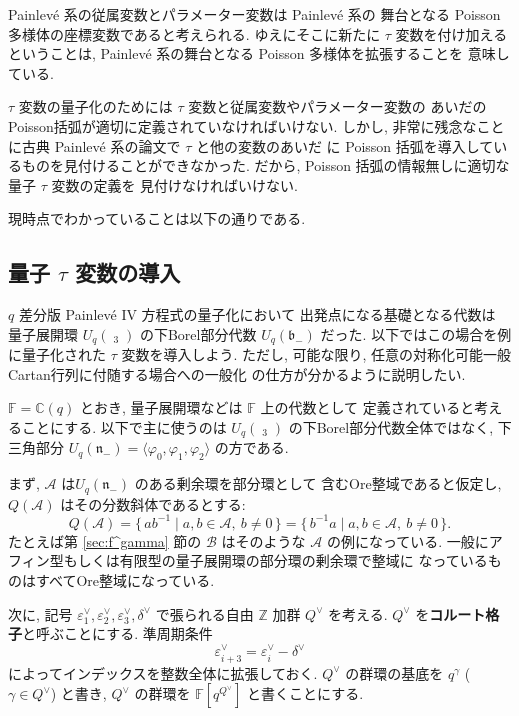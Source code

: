 \documentclass[12pt,twoside,dvipdfm]{msjproc}
\newcommand\Z{{\mathbb Z}} %
\newcommand\F{{\mathbb F}} %
\newcommand\C{{\mathbb C}} %
\theoremstyle{definition} %
\theoremstyle{definition} %
\theoremstyle{definition} %
\numberwithin{theorem}{section}
\numberwithin{equation}{section}
\numberwithin{figure}{section}
\numberwithin{table}{section}
\newcommand\secref[1]{第 \ref{#1} 節}
\newcommand\bor{\mathfrak{b}}
\newcommand\nil{\mathfrak{n}}
\newcommand\bra{\langle}
\newcommand\ket{\rangle}
\newcommand\A{\mathcal{A}}
\newcommand\B{\mathcal{B}}
\newcommand\glhat{\mathop{\widehat{\mathrm{gl}}}\nolimits}
\newcommand\ev{\varepsilon^\vee}
\newcommand\dv{\delta^\vee}
\newcommand\Qv{{Q^\vee}}
\begin{document}
Painlev\'e 系の従属変数とパラメーター変数は Painlev\'e 系の
舞台となる Poisson 多様体の座標変数であると考えられる.
ゆえにそこに新たに $\tau$ 変数を付け加えるということは,
Painlev\'e 系の舞台となる Poisson 多様体を拡張することを
意味している. 

$\tau$ 変数の量子化のためには $\tau$ 変数と従属変数やパラメーター変数の
あいだのPoisson括弧が適切に定義されていなければいけない.
しかし, 非常に残念なことに古典 Painlev\'e 系の論文で $\tau$ と他の変数のあいだ
に Poisson 括弧を導入しているものを見付けることができなかった.
だから, Poisson 括弧の情報無しに適切な量子 $\tau$ 変数の定義を
見付けなければいけない.

現時点でわかっていることは以下の通りである.



\subsection{量子 $\tau$ 変数の導入}

$q$ 差分版 Painlev\'e IV 方程式の量子化において
出発点になる基礎となる代数は
量子展開環 $U_q(\glhat_3)$ の下Borel部分代数 $U_q(\bor_-)$ だった. 
以下ではこの場合を例に量子化された $\tau$ 変数を導入しよう.
ただし, 可能な限り, 任意の対称化可能一般Cartan行列に付随する場合への一般化
の仕方が分かるように説明したい.

$\F=\C(q)$ とおき, 量子展開環などは $\F$ 上の代数として
定義されていると考えることにする.
以下で主に使うのは $U_q(\glhat_3)$ の下Borel部分代数全体ではなく, 
下三角部分 $U_q(\nil_-)=\bra\varphi_0,\varphi_1,\varphi_2\ket$
の方である.

まず, $\A$ は$U_q(\nil_-)$ のある剰余環を部分環として
含むOre整域であると仮定し, $Q(\A)$ はその分数斜体であるとする:
\begin{equation*}
 Q(\A) 
 = \{\, ab^{-1} \mid a,b\in\A,\ b\ne0 \,\}
 = \{\, b^{-1}a \mid a,b\in\A,\ b\ne0 \,\}.
\end{equation*}
たとえば\secref{sec:f^gamma}の $\B$ はそのような $\A$ の例になっている.
一般にアフィン型もしくは有限型の量子展開環の部分環の剰余環で整域に
なっているものはすべてOre整域になっている.

次に, 記号 $\ev_1,\ev_2,\ev_3,\dv$ で張られる自由 $\Z$ 加群 $\Qv$ を考える.
$\Qv$ を{\bf コルート格子}と呼ぶことにする.
準周期条件
\begin{equation*}
  \ev_{i+3} = \ev_i - \dv
\end{equation*}
によってインデックスを整数全体に拡張しておく.
$\Qv$ の群環の基底を $q^\gamma$ ($\gamma\in\Qv$) と書き, 
$\Qv$ の群環を $\F[q^\Qv]$ と書くことにする.
\end{document}
